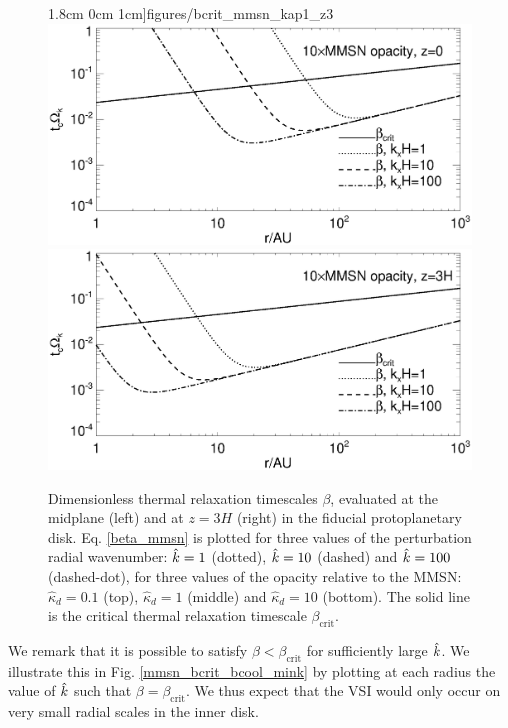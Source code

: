 \begin{figure}
  1.8cm 0cm 1cm]{figures/bcrit_mmsn_kap1_z3}\\
  \includegraphics[scale=.47,clip=true,trim=0cm 0cm 0cm
  1cm]{figures/bcrit_mmsn_kap10_z0}\includegraphics[scale=.47,clip=true,trim=2.5cm 0cm 0cm
  1cm]{figures/bcrit_mmsn_kap10_z3} 
  \caption{Dimensionless thermal relaxation timescales $\beta$,
    evaluated at the midplane (left) and at $z=3H$ (right) in the
    fiducial protoplanetary disk. Eq. \ref{beta_mmsn} is plotted  
    for three values of the 
    perturbation radial wavenumber: $\hat{k}=1$ (dotted), $\hat{k}=10$
    (dashed) and $\hat{k}=100$ (dashed-dot), for three values of the
    opacity relative to the MMSN: $\hat{\kappa}_d=0.1$ (top),
    $\hat{\kappa}_d=1$ (middle) and $\hat{\kappa}_d=10$ (bottom).  
    The solid line is the 
    critical thermal relaxation timescale $\beta_\mathrm{crit}$.  
    \label{mmsn_bcrit_bcool}}   
\end{figure}  

We remark that it is possible to satisfy $\beta < \beta_\mathrm{crit}$
for sufficiently large $\hat{k}$. We
illustrate this in Fig. \ref{mmsn_bcrit_bcool_mink} by plotting at 
each radius the value of $\hat{k}$ such  
that $\beta = \beta_\mathrm{crit}$. We thus expect that the VSI would only
occur on very small radial scales in the inner disk. %

